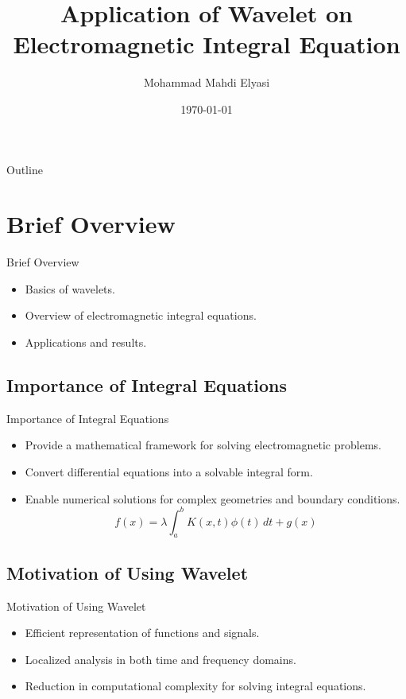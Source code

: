 \documentclass{beamer}
\title[Wavelet on Integral Equation]{Application of Wavelet on Electromagnetic Integral Equation}
\author[]{Mohammad Mahdi Elyasi}
\institute[Amirkabir University of Techonology]{
    Supervisor: Dr. Moradi \\[1cm] %
    Faculty of Electrical Engineering \\ %
}
\date{\today} %
\begin{document}
\begin{frame}
    
    \titlepage
\end{frame}

\begin{frame}{Outline}
    \tableofcontents
\end{frame}

\section{Brief Overview}
\begin{frame}{Brief Overview}
    \begin{itemize}
        \vspace*{-\baselineskip}
        \item Basics of wavelets.
        \item Overview of electromagnetic integral equations.
        \item Applications and results.
    \end{itemize}
\end{frame}

\subsection{Importance of Integral Equations}
\begin{frame}{Importance of Integral Equations}
    \begin{itemize}
        \item Provide a mathematical framework for solving electromagnetic problems.
        \item Convert differential equations into a solvable integral form.
        \item Enable numerical solutions for complex geometries and boundary conditions.
        \[
              f(x) = \lambda \int_a^b K(x, t)\phi(t) \,dt + g(x)
        \]
    \end{itemize}
\end{frame}

\subsection{Motivation of Using Wavelet}
\begin{frame}{Motivation of Using Wavelet}
    \begin{itemize}
        \item Efficient representation of functions and signals.
        \item Localized analysis in both time and frequency domains.
        \item Reduction in computational complexity for solving integral equations.
        
    \end{itemize}
\end{frame}
\end{document}
